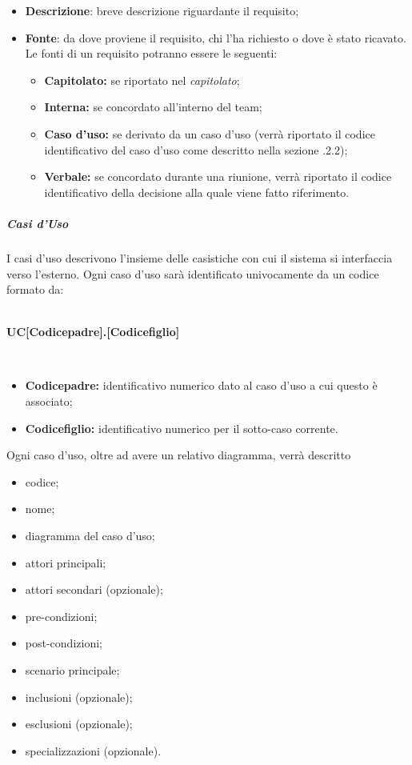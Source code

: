 \begin{itemize}
  \item \textbf{Descrizione}: breve descrizione riguardante il requisito;
  \item \textbf{Fonte}: da dove proviene il requisito, chi l'ha richiesto o dove è stato ricavato. Le fonti di un requisito potranno essere le seguenti:
  \begin{itemize}
  	\item \textbf{Capitolato\glos:} se riportato nel \textit{capitolato\glos};
  	\item \textbf{Interna:} se concordato all'interno del team;
  	\item \textbf{Caso d'uso:} se derivato da un caso d'uso (verrà riportato il codice identificativo del caso d'uso come descritto nella sezione .2.2);
  	\item \textbf{Verbale:} se concordato durante una riunione, verrà riportato il codice identificativo della decisione alla quale viene fatto riferimento.
  \end{itemize}
\end{itemize}

\subparagraph*{Casi d'Uso}
I casi d'uso descrivono l'insieme delle casistiche con cui il sistema si interfaccia verso l'esterno. Ogni caso d'uso sarà identificato univocamente da un codice formato da:
\\\\
\centerline{\textbf{UC[Codicepadre].[Codicefiglio]}}\\

\begin{itemize}
	\item \textbf{Codicepadre:} identificativo numerico dato al caso d'uso a cui questo è associato;
	\item \textbf{Codicefiglio:} identificativo numerico per il sotto-caso corrente.
\end{itemize}
Ogni caso d'uso, oltre ad avere un relativo diagramma, verrà descritto
\begin{itemize}
  \item codice;
  \item nome;
  \item diagramma del caso d'uso;
  \item attori principali;
  \item attori secondari (opzionale);
  \item pre-condizioni;
  \item post-condizioni;
  \item scenario principale;
  \item inclusioni (opzionale);
  \item esclusioni (opzionale);
  \item specializzazioni (opzionale).
\end{itemize}


